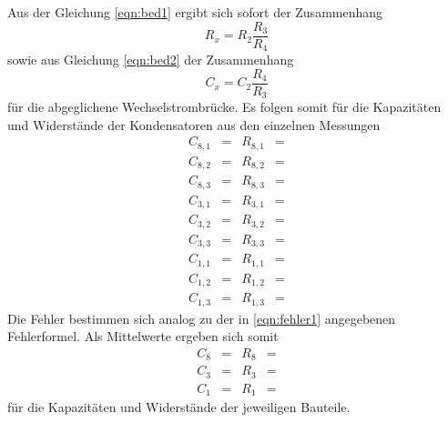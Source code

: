 Aus der Gleichung \ref{eqn:bed1} ergibt sich sofort der Zusammenhang
\begin{equation}
  R_x = R_2 \frac{R_3}{R_4}
\end{equation}
sowie aus Gleichung \ref{eqn:bed2} der Zusammenhang
\begin{equation}
  C_x = C_2 \frac{R_4}{R_3}
\end{equation}
für die abgeglichene Wechselstrombrücke.
Es folgen somit für die Kapazitäten und Widerstände der Kondensatoren aus den einzelnen Messungen
\begin{align*}
  C_{8,1}   &=  & R_{8,1} &= \\
  C_{8,2}   &=  & R_{8,2} &= \\
  C_{8,3}   &=  & R_{8,3} &= 
\end{align*}
\begin{align*}
  C_{3,1}   &=  & R_{3,1} &= \\
  C_{3,2}   &=  & R_{3,2} &= \\
  C_{3,3}   &=  & R_{3,3} &= 
\end{align*}
\begin{align*}
  C_{1,1}   &=  & R_{1,1} &= \\
  C_{1,2}   &=  & R_{1,2} &= \\
  C_{1,3}   &=  & R_{1,3} &= 
\end{align*}
Die Fehler bestimmen sich analog zu der in \ref{eqn:fehler1} angegebenen Fehlerformel.
Als Mittelwerte ergeben sich somit
\begin{align*}
  C_{8}   &=  & R_{8} &= \\
  C_{3}   &=  & R_{3} &= \\
  C_{1}   &=  & R_{1} &= 
\end{align*}
für die Kapazitäten und Widerstände der jeweiligen Bauteile.

